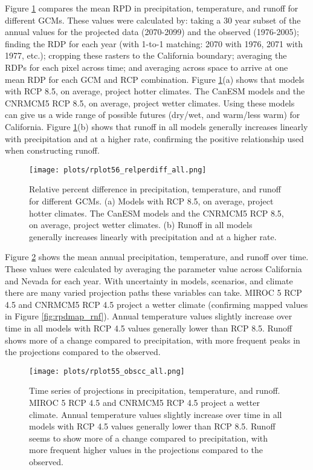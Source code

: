 Figure \ref{fig:rpd_var} compares the mean RPD in precipitation, temperature, and runoff for different GCMs. These values were calculated by: taking a 30 year subset of the annual values for the projected data (2070-2099) and the observed (1976-2005); finding the RDP for each year (with 1-to-1 matching: 2070 with 1976, 2071 with 1977, etc.); cropping these rasters to the California boundary; averaging the RDPs for each pixel across time; and averaging across space to arrive at one mean RDP for each GCM and RCP combination. Figure \ref{fig:rpd_var}(a) shows that models with RCP 8.5, on average, project hotter climates. The CanESM models and the CNRMCM5 RCP 8.5, on average, project wetter climates. Using these models can give us a wide range of possible futures (dry/wet, and warm/less warm) for California. Figure \ref{fig:rpd_var}(b) shows that runoff in all models generally increases linearly with precipitation and at a higher rate, confirming the positive relationship used when constructing runoff. 
 
\begin{figure}
	\centering
	\texttt{[image: plots/rplot56\_relperdiff\_all.png]}
	\caption[Relative percent difference in precipitation, temperature, and runoff for different GCMs.]{Relative percent difference in precipitation, temperature, and runoff for different GCMs. (a) Models with RCP 8.5, on average, project hotter climates. The CanESM models and the CNRMCM5 RCP 8.5, on average, project wetter climates. (b) Runoff in all models generally increases linearly with precipitation and at a higher rate.}
	\label{fig:rpd_var}
\end{figure}

Figure \ref{fig:obscc_var} shows the mean annual precipitation, temperature, and runoff over time. These values were calculated by averaging the parameter value across California and Nevada for each year. With uncertainty in models, scenarios, and climate there are many varied projection paths these variables can take. MIROC 5 RCP 4.5 and CNRMCM5 RCP 4.5 project a wetter climate (confirming mapped values in Figure \ref{fig:rpdmap_rnf}). Annual temperature values slightly increase over time in all models with RCP 4.5 values generally lower than RCP 8.5.  Runoff shows more of a change compared to precipitation, with more frequent peaks in the projections compared to the observed. 

\begin{figure}
	\centering
	\texttt{[image: plots/rplot55\_obscc\_all.png]}
	\caption[Time series of projections in precipitation, temperature, and runoff.]{Time series of projections in precipitation, temperature, and runoff. MIROC 5 RCP 4.5 and CNRMCM5 RCP 4.5 project a wetter climate. Annual temperature values slightly increase over time in all models with RCP 4.5 values generally lower than RCP 8.5. Runoff seems to show more of a change compared to precipitation, with more frequent higher values in the projections compared to the observed.}
	\label{fig:obscc_var}
\end{figure}

